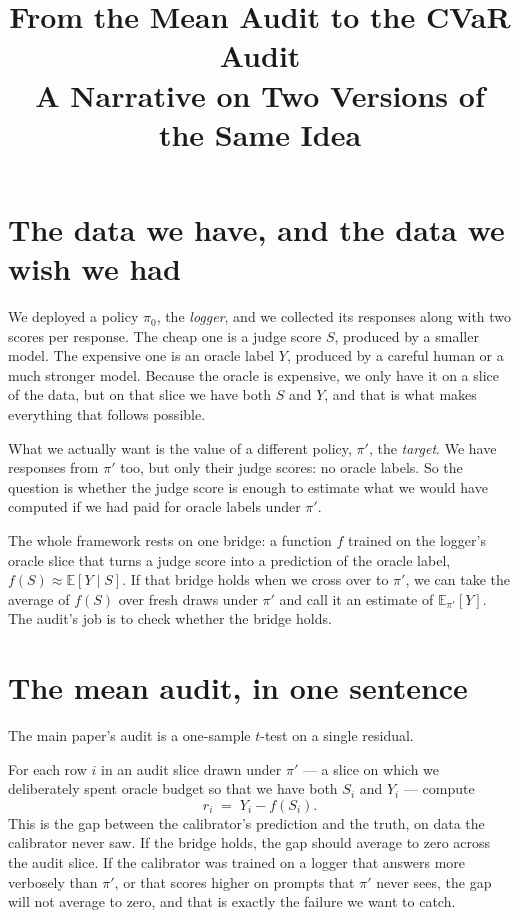 \documentclass[11pt]{article}
\title{From the Mean Audit to the CVaR Audit\\\large A Narrative on Two Versions of the Same Idea}
\author{}
\date{}
\newcommand{\E}{\mathbb{E}}
\newcommand{\pzero}{\pi_{0}}
\newcommand{\pprime}{\pi'}
\begin{document}
\maketitle

\section*{The data we have, and the data we wish we had}

We deployed a policy $\pzero$, the \emph{logger}, and we collected its responses along with two scores per response. The cheap one is a judge score $S$, produced by a smaller model. The expensive one is an oracle label $Y$, produced by a careful human or a much stronger model. Because the oracle is expensive, we only have it on a slice of the data, but on that slice we have both $S$ and $Y$, and that is what makes everything that follows possible.

What we actually want is the value of a different policy, $\pprime$, the \emph{target}. We have responses from $\pprime$ too, but only their judge scores: no oracle labels. So the question is whether the judge score is enough to estimate what we would have computed if we had paid for oracle labels under $\pprime$.

The whole framework rests on one bridge: a function $f$ trained on the logger's oracle slice that turns a judge score into a prediction of the oracle label, $f(S) \approx \E[Y \mid S]$. If that bridge holds when we cross over to $\pprime$, we can take the average of $f(S)$ over fresh draws under $\pprime$ and call it an estimate of $\E_{\pprime}[Y]$. The audit's job is to check whether the bridge holds.

\section*{The mean audit, in one sentence}

The main paper's audit is a one-sample $t$-test on a single residual.

For each row $i$ in an audit slice drawn under $\pprime$ --- a slice on which we deliberately spent oracle budget so that we have both $S_i$ and $Y_i$ --- compute
\[
r_i \;=\; Y_i - f(S_i).
\]
This is the gap between the calibrator's prediction and the truth, on data the calibrator never saw. If the bridge holds, the gap should average to zero across the audit slice. If the calibrator was trained on a logger that answers more verbosely than $\pprime$, or that scores higher on prompts that $\pprime$ never sees, the gap will not average to zero, and that is exactly the failure we want to catch.
\end{document}
